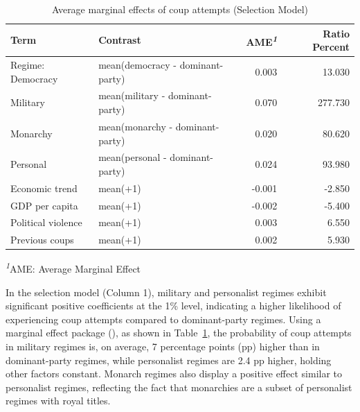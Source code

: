 \documentclass[
  12pt,
]{report}
\begin{document}
\begin{longtable}{@{\extracolsep{\fill}}llrr}

\caption{\label{tbl-mfx1}Average marginal effects of coup attempts
(Selection Model)}

\tabularnewline

\toprule
Term & Contrast & AME\textsuperscript{\textit{1}} & Ratio Percent \\ 
\midrule\addlinespace[2.5pt]
Regime: Democracy & mean(democracy - dominant-party) & 0.003 & 13.030 \\ 
{\hspace{47.25pt}Military} & mean(military - dominant-party) & 0.070 & 277.730 \\ 
{\hspace{47.25pt}Monarchy} & mean(monarchy - dominant-party) & 0.020 & 80.620 \\ 
{\hspace{47.25pt}Personal} & mean(personal - dominant-party) & 0.024 & 93.980 \\ 
Economic trend & mean(+1) & -0.001 & -2.850 \\ 
GDP per capita & mean(+1) & -0.002 & -5.400 \\ 
Political violence & mean(+1) & 0.003 & 6.550 \\ 
Previous coups & mean(+1) & 0.002 & 5.930 \\ 
\bottomrule

\end{longtable}

\begin{minipage}{\linewidth}
\textsuperscript{\textit{1}}AME: Average Marginal Effect\\
\end{minipage}
\endgroup

In the selection model (Column 1), military and personalist regimes
exhibit significant positive coefficients at the 1\% level, indicating a
higher likelihood of experiencing coup attempts compared to
dominant-party regimes. Using a marginal effect package
(),
as shown in Table~\ref{tbl-mfx1}, the probability of coup attempts in
military regimes is, on average, 7 percentage points (pp) higher than in
dominant-party regimes, while personalist regimes are 2.4 pp higher,
holding other factors constant. Monarch regimes also display a positive
effect similar to personalist regimes, reflecting the fact that
monarchies are a subset of personalist regimes with royal titles.
\end{document}
